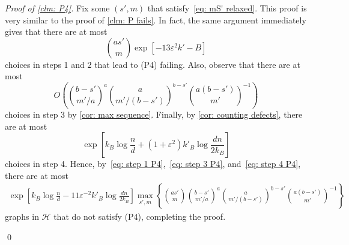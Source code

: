\documentclass[11pt]{article}
\newcommand{\eps}{\varepsilon}
\theoremstyle{plain}
\begin{document}
\smallskip
\noindent\textit{Proof of \cref{clm: P4}.}
Fix some $(s',m)$ that satisfy~\eqref{eq: mS' relaxed}. This proof is very similar to the proof of \cref{clm: P fails}. In fact, the same argument immediately gives that there are at most 
\begin{equation}\label{eq: step 1 P4}
    \binom{as'}{m}\exp\left[-13\eps^2k'-B\right]
\end{equation}
choices in steps 1 and 2 that lead to (P4) failing. Also, observe that there are at most 
\begin{equation}\label{eq: step 3 P4}
    O\left(\binom{b-s'}{m'/a}^a\binom{a}{m'/(b - s')}^{b - s'}\binom{a(b-s')}{m'}^{-1}\right)
\end{equation}
choices in step 3 by \cref{cor: max sequence}. Finally, by \cref{cor: counting defects}, there are at most 
\begin{equation}\label{eq: step 4 P4}
    \exp\left[k_B\log\frac{n}{d} +(1 + \eps^2)k'_B\log\frac{dn}{2k_B}\right]
\end{equation}
choices in step 4. Hence, by~\eqref{eq: step 1 P4},~\eqref{eq: step 3 P4}, and~\eqref{eq: step 4 P4}, there are at most 
\begin{align*}
    \exp\left[k_B\log\frac{n}{d}-11\eps^{-2}k'_B\log\frac{dn}{2k_B}\right]\max_{s', m}\left\{\binom{as'}{m}\binom{b - s'}{m'/a}^a\binom{a}{m'/(b - s')}^{b - s'}\binom{a(b - s')}{m'}^{-1} \right\}
\end{align*}
graphs in $\mathcal H$ that do not satisfy (P4), completing the proof.

\qed

\medskip
\end{document}
